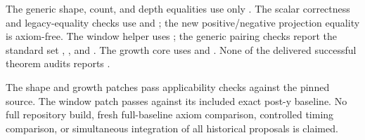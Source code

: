 The generic shape, count, and depth equalities use only . The scalar correctness and legacy-equality checks use  and ; the new positive/negative projection equality is axiom-free. The window helper uses ; the generic pairing checks report the standard set , , and . The growth core uses  and . None of the delivered successful theorem audits reports .

The shape and growth patches pass applicability checks against the pinned source. The window patch passes against its included exact post-y baseline. No full repository build, fresh full-baseline axiom comparison, controlled timing comparison, or simultaneous integration of all historical proposals is claimed.
